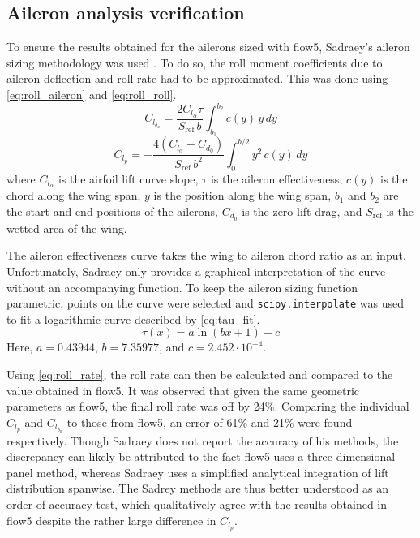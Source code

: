 \subsection{Aileron analysis verification}
\label{sec:aileron_vnv}
To ensure the results obtained for the ailerons sized with flow5, Sadraey's aileron sizing methodology was used \cite[p.657-661]{sadraey2012aircraftdesign}. To do so, the roll moment coefficients due to aileron deflection and roll rate had to be approximated. This was done using \autoref{eq:roll_aileron} and \autoref{eq:roll_roll}.
\begin{equation}\label{eq:roll_aileron}
    C_{l_{\delta_{a}}} = 
    \frac{2 C_{l_{\alpha}} \tau}{S_{\text{ref}}\, b} \int_{b_1}^{b_2} c(y)\, y\, dy
\end{equation}
\begin{equation}\label{eq:roll_roll}
    C_{l_{p}} = 
    -\frac{4(C_{l_{\alpha}} + C_{d_{0}})}{S_{\text{ref}}\, b^2}\int_{0}^{b/2} y^2\, c(y)\, dy
\end{equation}
where $C_{l_{\alpha}}$ is the airfoil lift curve slope, $\tau$ is the aileron effectiveness, $c(y)$ is the chord along the wing span, $y$ is the position along the wing span, $b_1$ and $b_2$ are the start and end positions of the ailerons, $C_{d_{0}}$ is the zero lift drag, and $S_{\text{ref}}$ is the wetted area of the wing.

The aileron effectiveness curve takes the wing to aileron chord ratio as an input. Unfortunately, Sadraey only provides a graphical interpretation of the curve without an accompanying function. To keep the aileron sizing function parametric, points on the curve were selected and \texttt{scipy.interpolate} was used to fit a logarithmic curve described by \autoref{eq:tau_fit}.
\begin{equation}\label{eq:tau_fit}
    \tau(x) = a \ln(bx + 1) + c
\end{equation}
Here, $a = 0.43944$, $b = 7.35977$, and $c = 2.452 \cdot 10^{-4}$.

Using \autoref{eq:roll_rate}, the roll rate can then be calculated and compared to the value obtained in flow5. It was observed that given the same geometric parameters as flow5, the final roll rate was off by 24\%. Comparing the individual $C_{l_{p}}$ and $C_{l_{\delta_{a}}}$ to those from flow5, an error of 61\% and 21\% were found respectively. Though Sadraey does not report the accuracy of his methods, the discrepancy can likely be attributed to the fact flow5 uses a three-dimensional panel method, whereas Sadraey uses a simplified analytical integration of lift distribution spanwise. The Sadrey methods are thus better understood as an order of accuracy test, which qualitatively agree with the results obtained in flow5 despite the rather large difference in $C_{l_p}$.%




